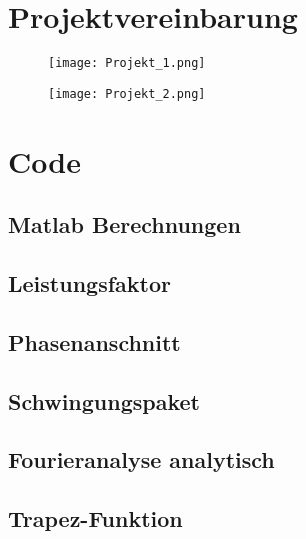 \begin{appendix} %
\section{Projektvereinbarung}	
\begin{figure}[ht!]
	\centering
	\texttt{[image: Projekt\_1.png]}	
\end{figure}
\newpage
\begin{figure}[ht!]
	\centering
	\texttt{[image: Projekt\_2.png]}	
\end{figure}
\newpage
\section{Code}
\subsection{Matlab Berechnungen}
\subsection*{Leistungsfaktor}\label{sec:Leistungsfaktor_Berechnung}


\subsection*{Phasenanschnitt}\label{sec:Phasenanschnitt_Berechnung}


\subsection*{Schwingungspaket}\label{sec:Schwingungspaket_Berechnung}


\subsection*{Fourieranalyse analytisch}\label{sec:Fourieranalyse_Berechnung}


\subsection*{Trapez-Funktion}\label{sec:Trapez_Berechnung}



\end{appendix}
